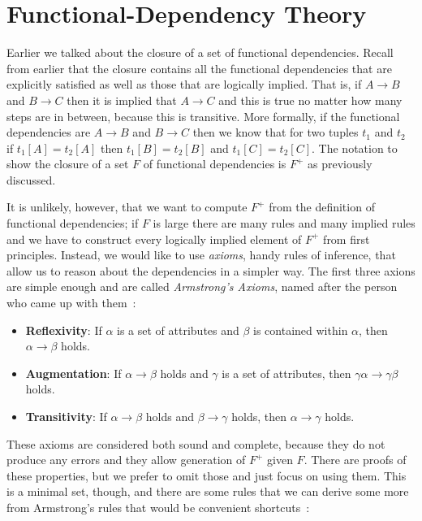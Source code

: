 




\section*{Functional-Dependency Theory}

Earlier we talked about the closure of a set of functional dependencies. Recall from earlier that the closure contains all the functional dependencies that are explicitly satisfied as well as those that are logically implied. That is, if $A \rightarrow B$ and $B \rightarrow C$ then it is implied that $A \rightarrow C$ and this is true no matter how many steps are in between, because this is transitive. More formally, if the functional dependencies are $A \rightarrow B$ and $B \rightarrow C$ then we know that for two tuples $t_{1}$ and $t_{2}$ if $t_{1}[A] = t_{2}[A]$ then $t_{1}[B] = t_{2}[B]$ and $t_{1}[C] = t_{2}[C]$. The notation to show the closure of a set $F$ of functional dependencies is $F^{+}$ as previously discussed.

It is unlikely, however, that we want to compute $F^{+}$ from the definition of functional dependencies; if $F$ is large there are many rules and many implied rules and we have to construct every logically implied element of $F^{+}$ from first principles. Instead, we would like to use \textit{axioms}, handy rules of inference, that allow us to reason about the dependencies in a simpler way. The first three axions are simple enough and are called \textit{Armstrong's Axioms}, named after the person who came up with them~\cite{dsc}:

\begin{itemize}
	\item \textbf{Reflexivity}: If $\alpha$ is a set of attributes and $\beta$ is contained within $\alpha$, then $\alpha \rightarrow \beta$ holds.
	\item \textbf{Augmentation}: If $\alpha \rightarrow \beta$ holds and $\gamma$ is a set of attributes, then $\gamma\alpha \rightarrow \gamma\beta$ holds.
	\item \textbf{Transitivity}: If $\alpha \rightarrow \beta$ holds and $\beta \rightarrow \gamma$ holds, then $\alpha \rightarrow \gamma$ holds.
\end{itemize}

These axioms are considered both sound and complete, because they do not produce any errors and they allow generation of $F^{+}$ given $F$. There are proofs of these properties, but we prefer to omit those and just focus on using them. This is a minimal set, though, and there are some rules that we can derive some more from Armstrong's rules that would be convenient shortcuts~\cite{dsc}:

